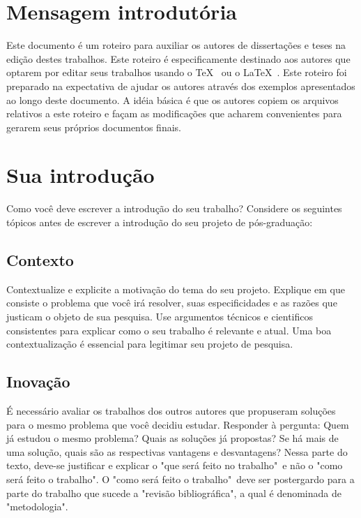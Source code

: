 \section{Mensagem introdutória}
Este documento é um roteiro para auxiliar os autores de
dissertações e teses na edição destes trabalhos.
Este roteiro é especificamente destinado aos autores que optarem
por editar seus trabalhos usando o \TeX\ \cite{knuth:tex,texbook} ou o \LaTeX\ \cite{lamport:latex,latexbook}.
Este roteiro foi preparado na expectativa de ajudar os autores
através dos exemplos apresentados ao longo deste documento. A
idéia básica é que os autores copiem os arquivos
relativos a este roteiro e façam as modificações que
acharem convenientes para gerarem seus próprios documentos finais.

\section{Sua introdução}
Como você deve escrever a introdução do seu trabalho? Considere os seguintes tópicos antes de escrever a introdução do seu projeto de pós-graduação:

\subsection{Contexto}
Contextualize e explicite a motivação do tema do seu projeto. Explique em que consiste o problema que você irá resolver, suas especificidades e as razões que justicam o objeto de sua pesquisa. Use argumentos técnicos e cientificos consistentes para explicar como o seu trabalho é relevante e  atual. Uma boa contextualização é essencial para legitimar seu projeto de pesquisa.

\subsection{Inovação}
É necessário avaliar os trabalhos dos outros autores que propuseram soluções para o mesmo problema que você decidiu estudar. Responder à pergunta: Quem já estudou o mesmo problema? Quais as soluções já propostas? Se há mais de uma solução, quais são as respectivas vantagens e desvantagens? Nessa parte do texto, deve-se justificar e explicar o "que será feito no trabalho"\ e não o "como será feito o trabalho". O "como será feito o trabalho"\ deve ser postergardo para a parte do trabalho que sucede a "revisão bibliográfica", a qual é denominada de "metodologia".


